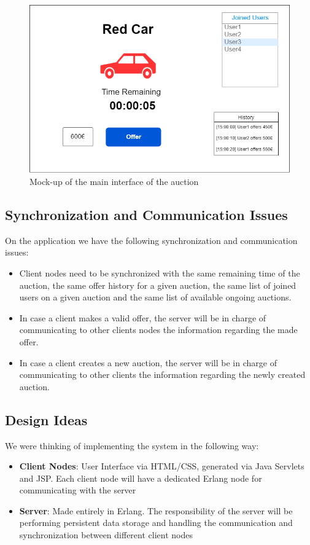 \begin{figure}[H]
	\centering
	\includegraphics[width=0.7\linewidth]{img/wireframeDSMT.drawio}
	\caption{Mock-up of the main interface of the auction}
	\label{fig:wireframedsmt}
\end{figure}

\subsection{Synchronization and Communication Issues}
On the application we have the following synchronization and communication issues:
\begin{itemize}
	\item Client nodes need to be synchronized with the same remaining time of the auction, the same offer history for a given auction, the same list of joined users on a given auction and the same list of available ongoing auctions.
	\item In case a client makes a valid offer, the server will be in charge of  communicating to other clients nodes the information regarding the made offer. 
	\item In case a client creates a new auction, the server will be in charge of communicating to other clients the information regarding the newly created auction.
\end{itemize}


\subsection{Design Ideas}
We were thinking of implementing the system in the following way:
\begin{itemize}
	\item \textbf{Client Nodes}: User Interface via HTML/CSS, generated via Java Servlets and JSP. Each client node will have a dedicated Erlang node for communicating with the server
	\item \textbf{Server}: Made entirely in Erlang. The responsibility of the server will be performing persistent data storage and handling the communication and synchronization between different client nodes
\end{itemize}